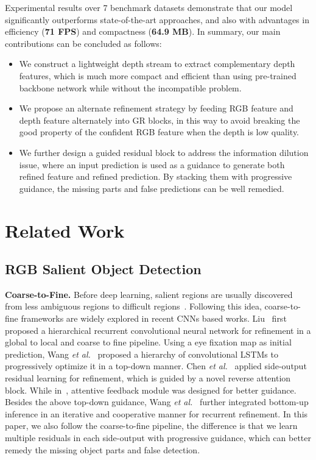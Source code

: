 \documentclass[runningheads]{llncs}
\begin{document}
Experimental results over 7 benchmark datasets demonstrate that our model significantly outperforms state-of-the-art approaches, and also with advantages in efficiency (\textbf{71 FPS}) and compactness (\textbf{64.9 MB}). In summary, our main contributions can be concluded as follows:
\begin{itemize}

\item We construct a lightweight depth stream to extract complementary depth features, which is much more compact and efficient than using pre-trained backbone network while without the incompatible problem.

\item We propose an alternate refinement strategy by feeding RGB feature and depth feature alternately into GR blocks, in this way to avoid breaking the good property of the confident RGB feature when the depth is low quality.

\item We further design a guided residual block to address the information dilution issue, where an input prediction is used as a guidance to generate both refined feature and refined prediction. By stacking them with progressive guidance, the missing parts and false predictions can be well remedied.
\end{itemize}

\section{Related Work}
\subsection{RGB Salient Object Detection}
\textbf{Coarse-to-Fine.} Before deep learning, salient regions are usually discovered from less ambiguous regions to difficult regions~\cite{gong2015saliency}\cite{zhang2016ranking}\cite{chen2016pr}. Following this idea, coarse-to-fine frameworks are widely explored in recent CNNs based works. Liu~\cite{liu2016dhsnet} first proposed a hierarchical recurrent convolutional neural network for refinement in a global to local and coarse to fine pipeline. Using a eye fixation map as initial prediction, Wang \textit{et al.}~\cite{wang2018salient} proposed a hierarchy of convolutional LSTMs to progressively optimize it in a top-down manner. Chen \textit{et al.}~\cite{chen2018reverse}\cite{chen2020tip} applied side-output residual learning for refinement, which is guided by a novel reverse attention block. While in~\cite{feng2019attentive}, attentive feedback module was designed for better guidance. Besides the above top-down guidance, Wang \textit{et al.}~\cite{wang2019iterative} further integrated bottom-up inference in an iterative and cooperative manner for recurrent refinement. In this paper, we also follow the coarse-to-fine pipeline, the difference is that we learn multiple residuals in each side-output with progressive guidance, which can better remedy the missing object parts and false detection.
\end{document}
